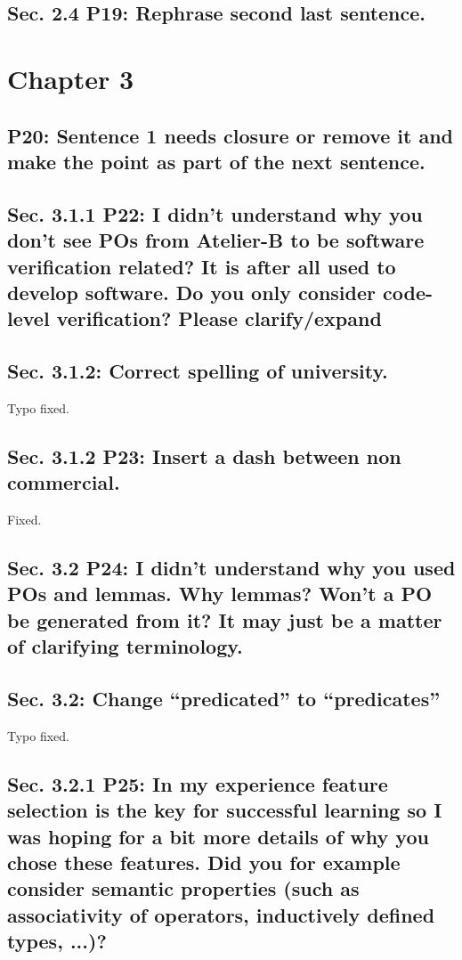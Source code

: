 \documentclass[]{article}
\begin{document}
\subsection{Sec. 2.4 P19: Rephrase second last sentence.}

\section{Chapter 3}

\subsection{P20: Sentence 1 needs closure or remove it and make the point as part of the next sentence.}

\subsection{Sec. 3.1.1 P22: I didn't understand why you don't see POs from Atelier-B to be software verification related? It is after all used to develop software. Do you only consider code-level verification? Please clarify/expand}

\subsection{Sec. 3.1.2: Correct spelling of university.}

Typo fixed.

\subsection{Sec. 3.1.2 P23: Insert a dash between non commercial.}

Fixed.

\subsection{Sec. 3.2 P24: I didn't understand why you used POs and lemmas. Why lemmas? Won't a PO be generated from it? It may just be a matter of clarifying terminology.}

\subsection{Sec. 3.2: Change “predicated” to “predicates”}

Typo fixed.

\subsection{Sec. 3.2.1 P25: In my experience feature selection is the key for successful learning so I was hoping for a bit more details of why you chose these features. Did you for example consider semantic properties (such as associativity of operators, inductively defined types, ...)?}
\end{document}
